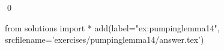 
\begin{ex} 
  \label{ex:pumpinglemma14}
  
  \qed
\end{ex} 
\begin{python0}
from solutions import *
add(label="ex:pumpinglemma14",
    srcfilename='exercises/pumpinglemma14/answer.tex') 
\end{python0}
